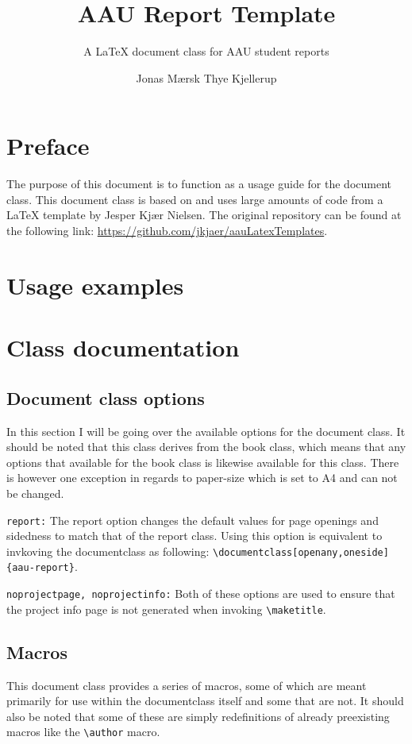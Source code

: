 \documentclass[11pt]{../aau-report}
\title{AAU Report Template}
\subtitle{A \LaTeX{} document class for AAU student reports}
\author{Jonas Mærsk Thye Kjellerup}
\newcommand\mn[1]{\texttt{\textbackslash{}#1}}
\begin{document}
\frontmatter
\def\bothFrontpages{1}



\tableofcontents
\chapter{Preface}
The purpose of this document is to function as a usage guide for the document class. This document class is based on and uses large amounts of code from a \LaTeX{} template by Jesper Kjær Nielsen. The original repository can be found at the following link: \url{https://github.com/jkjaer/aauLatexTemplates}.

\mainmatter
\chapter{Usage examples}
\chapter{Class documentation}

\section{Document class options}
In this section I will be going over the available options for the document class. It should be noted that this class derives from the book class, which means that any options that available for the book class is likewise available for this class.
There is however one exception in regards to paper-size which is set to A4 and can not be changed.

\texttt{report:} The report option changes the default values for page openings and sidedness to match that of the report class. Using this option is equivalent to invkoving the documentclass as following: \mn{documentclass[openany,oneside]\{aau-report\}}.

\texttt{noprojectpage, noprojectinfo:} Both of these options are used to ensure that the project info page is not generated when invoking \mn{maketitle}.

\section{Macros}
This document class provides a series of macros, some of which are meant primarily for use within the documentclass itself and some that are not. It should also be noted that some of these are simply redefinitions of already preexisting macros like the \mn{author} macro.
\end{document}
